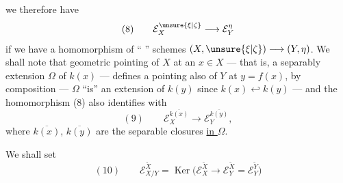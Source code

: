
we therefore have
\[
(8)\qquad \mathcal E_X^{\unsure{\xi|\zeta}}\longrightarrow\mathcal E_Y^\eta
\]
if we have a homomorphism of `` '' schemes $(X,\unsure{\xi|\zeta})\longrightarrow(Y,\eta)$. We shall note that  geometric pointing of $X$ at an $x\in X$ --- that is, a separably  extension $\Omega$ of $k(x)$ --- defines  a  pointing also of $Y$ at $y=f(x)$,  by composition --- $\Omega$ ``is'' an extension of $k(y)$ since $k(x)\hookleftarrow k(y)$ --- and the homomorphism (8) also identifies with
\[
(9)\qquad \mathcal E_X^{\overline{k(x)}}\longrightarrow\mathcal E_Y^{\overline{k(y)}},
\]
where $\overline{k(x)}$, $\overline{k(y)}$ are the separable closures \uline{in $\Omega$}.

We shall set
\[
(10)\qquad \mathcal E_{X/Y}^{\widetilde X}=\operatorname{Ker}\bigl(\mathcal E_X^{\widetilde X}\longrightarrow\mathcal E_Y^{\widetilde X}=\mathcal E_Y^{\widetilde Y}\bigr)
\]

